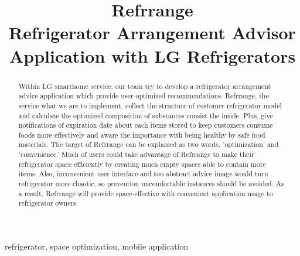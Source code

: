 \documentclass[conference]{IEEEtran}
\begin{document}
\title{Refrrange\\
{\footnotesize \large Refrigerator Arrangement Advisor Application with LG Refrigerators}}

\author{
\and
{}
}
\maketitle

\begin{abstract}
Within LG smarthome service, our team try to develop a refrigerator arrangement advice application which provide user-optimized recommendations. Refrrange, the service what we are to implement, collect the structure of customer refrigerator model and calculate the optimized composition of substances consist the inside. Plus, give notifications of expiration date about each items stored to keep customers consume foods more effectively and aware the importance with being healthy by safe food materials. The target of Refrrange can be explained as two words, 'optimization' and 'convenience.' Much of users could take advantage of Refrrange to make their refrigerator space efficiently by creating much empty spaces able to contain more items. Also, inconvenient user interface and too abstract advice image would turn refrigerator more chaotic, so prevention uncomfortable instances should be avoided. As a result, Refrrange will provide space-effective with convenient application usage to refrigerator owners.
\end{abstract}

\begin{IEEEkeywords}
refrigerator, space optimization, mobile application
\end{IEEEkeywords}
\end{document}
